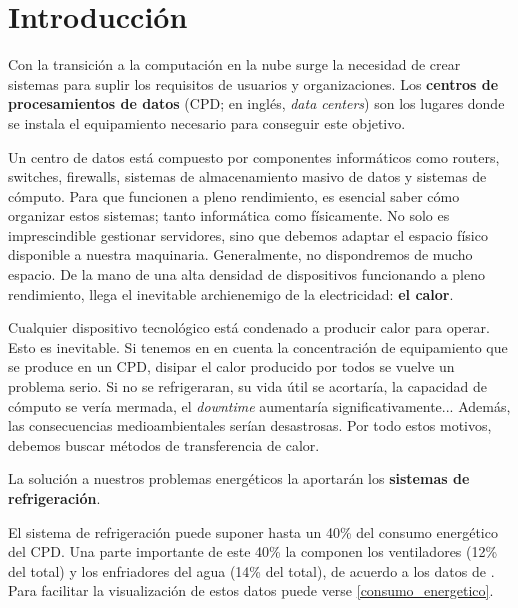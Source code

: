 


\chapter{Introducción}

Con la transición a la computación en la nube surge la necesidad de crear sistemas para suplir los requisitos de usuarios y organizaciones. Los \textbf{centros de procesamientos de datos} (CPD; en inglés, \textit{data centers}) son los lugares donde se instala el equipamiento necesario para conseguir este objetivo.

Un centro de datos está compuesto por componentes informáticos como routers, switches, firewalls, sistemas de almacenamiento masivo de datos y sistemas de cómputo. Para que funcionen a pleno rendimiento, es esencial saber cómo organizar estos sistemas; tanto informática como físicamente. No solo es imprescindible gestionar servidores, sino que debemos adaptar el espacio físico disponible a nuestra maquinaria. Generalmente, no dispondremos de mucho espacio. De la mano de una alta densidad de dispositivos funcionando a pleno rendimiento, llega el inevitable archienemigo de la electricidad: \textbf{el calor}.

Cualquier dispositivo tecnológico está condenado a producir calor para operar. Esto es inevitable. Si tenemos en en cuenta la concentración de equipamiento que se produce en un CPD, disipar el calor producido por todos se vuelve un problema serio. Si no se refrigeraran, su vida útil se acortaría, la capacidad de cómputo se vería mermada, el \textit{downtime} aumentaría significativamente... Además, las consecuencias medioambientales serían desastrosas. Por todo estos motivos, debemos buscar métodos de transferencia de calor.

La solución a nuestros problemas energéticos la aportarán los \textbf{sistemas de refrigeración}.

El sistema de refrigeración puede suponer hasta un 40\% del consumo energético del CPD. Una parte importante de este 40\% la componen los ventiladores (12\% del total) y los enfriadores del agua (14\% del total), de acuerdo a los datos de \cite{ZHANG2021102253}. Para facilitar la visualización de estos datos puede verse \eqref{consumo_energetico}.

